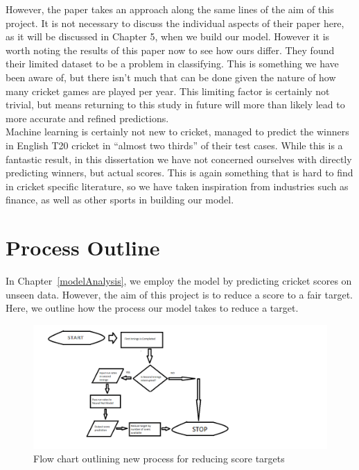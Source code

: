 However, the paper \cite{kumar} takes an approach along the same lines of the aim of this project. It is not necessary to discuss the individual aspects
of their paper here, as it will be discussed in Chapter 5, when we build our model. However it is worth noting the results of this paper now to see how
ours differ. They found their limited dataset to be a problem in classifying. This is something we have been aware of, but there isn't much that can be done
given the nature of how many cricket games are played per year. This limiting factor is certainly not trivial, but means returning to this study in future 
will more than likely lead to more accurate and refined predictions. \\

Machine learning is certainly not new to cricket, \cite{kampakis} managed to predict the winners in English T20 cricket in ``almost two thirds'' of their test cases. While this 
is a fantastic result, in this dissertation we have not concerned ourselves with directly predicting winners, but actual scores. This is again something that is hard to find 
in cricket specific literature, so we have taken inspiration from industries such as finance, as well as other sports in building our model. 

\section{Process Outline}

In Chapter~\ref{modelAnalysis}, we employ the model by predicting cricket scores on unseen data. However, the aim of this project is to 
reduce a score to a fair target. Here, we outline how the process our model takes to reduce a target. \\

\begin{figure}[h]
    \includegraphics[scale=0.6]{figures/procchart.png}
    \caption{Flow chart outlining new process for reducing score targets}
    \label{chart}
\end{figure}

